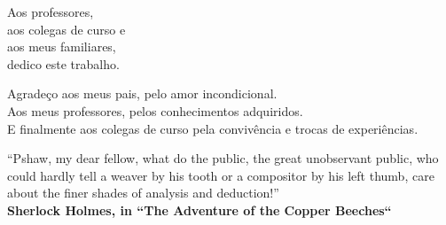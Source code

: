 \pretextualchapter{}
\vspace{8cm}
\begin{flushright}
\hfill \textnormal{
Aos professores, \\
aos colegas de curso e \\
aos meus familiares, \\
dedico este trabalho.}
\end{flushright}




\begin{minipage}{\textwidth}
    Agradeço aos meus pais, pelo amor incondicional. \\
    Aos meus professores, pelos conhecimentos adquiridos. \\
     E finalmente aos colegas de curso pela convivência e trocas de experiências.
\end{minipage}


\pretextualchapter{}
\vspace{8cm}
\begin{flushright}
\textnormal{``Pshaw, my dear fellow, what do the public, the great unobservant public, who could hardly tell a weaver by his tooth or a compositor by his left thumb, care about the finer shades of analysis and deduction!'' \\
	\bfseries Sherlock Holmes, in ``The Adventure of the Copper Beeches``}
\end{flushright}

